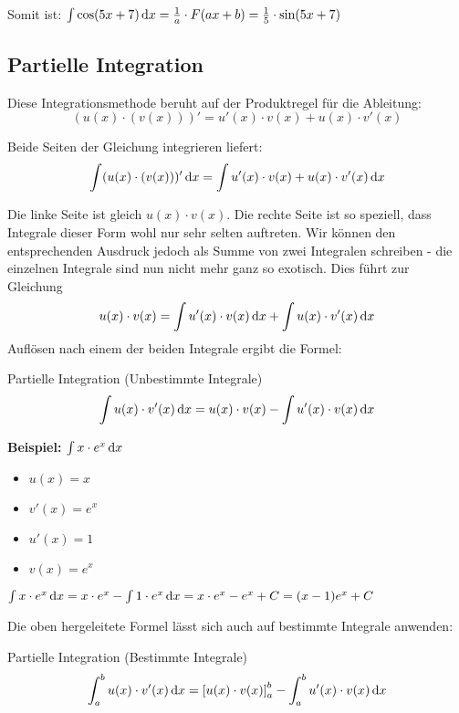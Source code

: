 Somit ist: $\int \cos(5x + 7) \,\mathrm{d}x = \frac{1}{a} \cdot F(ax + b) = \frac{1}{5} \cdot \sin(5x + 7)$

\subsection{Partielle Integration}\label{subsec:partielle-integration}

Diese Integrationsmethode beruht auf der Produktregel für die Ableitung: \[ (u(x) \cdot (v(x)))' = u'(x) \cdot v(x) + u(x) \cdot v'(x) \]

Beide Seiten der Gleichung integrieren liefert: \[ \int (u(x) \cdot (v(x)))' \,\mathrm{d}x = \int u'(x) \cdot v(x) + u(x) \cdot v'(x) \,\mathrm{d}x\]

Die linke Seite ist gleich $u(x) \cdot v(x)$.
Die rechte Seite ist so speziell, dass Integrale dieser Form wohl nur sehr selten auftreten.
Wir können den entsprechenden Ausdruck jedoch als Summe von zwei Integralen schreiben - die einzelnen Integrale sind nun nicht mehr ganz so exotisch.
Dies führt zur Gleichung \[ u(x) \cdot v(x) = \int u'(x) \cdot v(x) \,\mathrm{d}x + \int u(x) \cdot v'(x) \,\mathrm{d}x \]
Auflösen nach einem der beiden Integrale ergibt die Formel:
\begin{definition}{Partielle Integration (Unbestimmte Integrale)}
    \[\int u(x) \cdot v'(x) \,\mathrm{d}x = u(x) \cdot v(x) - \int u'(x) \cdot v(x) \,\mathrm{d}x\]
\end{definition}

\textbf{Beispiel:} $\int x \cdot e^x \,\mathrm{d}x$
\begin{multicols}{2}
    \begin{itemize}[label={}]
        \item $u(x) = x$
        \item $v'(x) = e^x$
        \item $u'(x) = 1$
        \item $v(x) = e^x$
    \end{itemize}
\end{multicols}
$\int x \cdot e^x \,\mathrm{d}x = x \cdot e^x - \int 1 \cdot e^x \,\mathrm{d}x = x \cdot e^x - e^x + C = (x - 1)e^x + C$

Die oben hergeleitete Formel lässt sich auch auf bestimmte Integrale anwenden:
\begin{definition}{Partielle Integration (Bestimmte Integrale)}
    \[ \int_{a}^{b} u(x) \cdot v'(x) \,\mathrm{d}x = \left[ u(x) \cdot v(x) \right]_{a}^{b} - \int_{a}^{b} u'(x) \cdot v(x) \,\mathrm{d}x\]
\end{definition}

